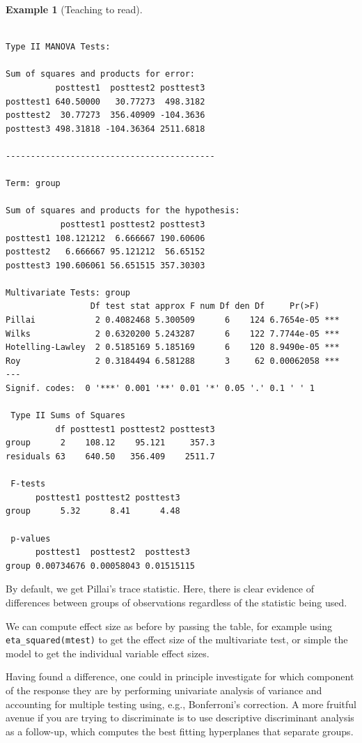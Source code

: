 \documentclass[
  11pt,
  letterpaper,
]{scrbook}
\theoremstyle{definition}
\newtheorem{example}{Example}[chapter]
\theoremstyle{definition}
\theoremstyle{remark}
\begin{document}
\begin{example}[Teaching to
read]
\begin{verbatim}

Type II MANOVA Tests:

Sum of squares and products for error:
          posttest1  posttest2 posttest3
posttest1 640.50000   30.77273  498.3182
posttest2  30.77273  356.40909 -104.3636
posttest3 498.31818 -104.36364 2511.6818

------------------------------------------
 
Term: group 

Sum of squares and products for the hypothesis:
           posttest1 posttest2 posttest3
posttest1 108.121212  6.666667 190.60606
posttest2   6.666667 95.121212  56.65152
posttest3 190.606061 56.651515 357.30303

Multivariate Tests: group
                 Df test stat approx F num Df den Df     Pr(>F)    
Pillai            2 0.4082468 5.300509      6    124 6.7654e-05 ***
Wilks             2 0.6320200 5.243287      6    122 7.7744e-05 ***
Hotelling-Lawley  2 0.5185169 5.185169      6    120 8.9490e-05 ***
Roy               2 0.3184494 6.581288      3     62 0.00062058 ***
---
Signif. codes:  0 '***' 0.001 '**' 0.01 '*' 0.05 '.' 0.1 ' ' 1

 Type II Sums of Squares
          df posttest1 posttest2 posttest3
group      2    108.12    95.121     357.3
residuals 63    640.50   356.409    2511.7

 F-tests
      posttest1 posttest2 posttest3
group      5.32      8.41      4.48

 p-values
      posttest1  posttest2  posttest3 
group 0.00734676 0.00058043 0.01515115
\end{verbatim}

By default, we get Pillai's trace statistic. Here, there is clear
evidence of differences between groups of observations regardless of the
statistic being used.

We can compute effect size as before by passing the table, for example
using \texttt{eta\_squared(mtest)} to get the effect size of the
multivariate test, or simple the model to get the individual variable
effect sizes.

Having found a difference, one could in principle investigate for which
component of the response they are by performing univariate analysis of
variance and accounting for multiple testing using, e.g., Bonferroni's
correction. A more fruitful avenue if you are trying to discriminate is
to use descriptive discriminant analysis as a follow-up, which computes
the best fitting hyperplanes that separate groups.


\end{example}
\end{document}
